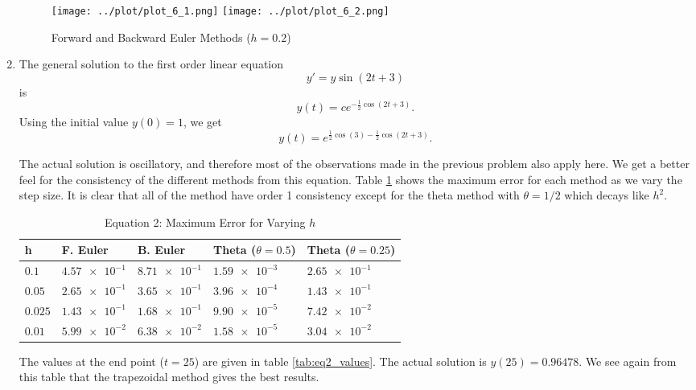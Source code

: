 \begin{solution}
\begin{enumerate}
    \begin{figure}[!ht]
      \centering
      \texttt{[image: ../plot/plot\_6\_1.png]}
      \texttt{[image: ../plot/plot\_6\_2.png]}
      \caption{Forward and Backward Euler Methods ($h = 0.2$)}
      \label{fig:stability}
    \end{figure}
    
    \item The general solution to the first order linear equation
    \[
      y' = y \sin(2t + 3)
    \]
    is 
    \[
      y(t) = c e^{-\frac12 \cos(2t + 3)}.
    \]
    Using the initial value $y(0) = 1$, we get 
    \[
      y(t) = e^{\frac12 \cos(3)-\frac12 \cos(2t + 3)}.
    \]
    
    The actual solution is oscillatory, and therefore most of the observations made in the previous problem also apply here. We get a better feel for the consistency of the different methods from this equation. Table \ref{tab:eq2_error} shows the maximum error for each method as we vary the step size. It is clear that all of the method have order 1 consistency except for the theta method with $\theta = 1/2$ which decays like $h^2$.
    
    \begin{table}[!ht]
      \label{tab:eq2_error}
      \centering
      \caption{Equation 2: Maximum Error for Varying $h$}
      \begin{tabular}{|l|l|l|l|l|}
        \hline
        h & F. Euler & B. Euler & Theta ($\theta = 0.5$) & Theta ($\theta =0.25$) \\
        \hline
        $0.1$   & $\num{4.57e-1}$ & $\num{8.71e-1}$ & $\num{1.59e-3}$ & $\num{2.65e-1}$ \\
        $0.05$  & $\num{2.65e-1}$ & $\num{3.65e-1}$ & $\num{3.96e-4}$ & $\num{1.43e-1}$ \\
        $0.025$ & $\num{1.43e-1}$ & $\num{1.68e-1}$ & $\num{9.90e-5}$ & $\num{7.42e-2}$ \\
        $0.01$  & $\num{5.99e-2}$ & $\num{6.38e-2}$ & $\num{1.58e-5}$ & $\num{3.04e-2}$ \\
        \hline
      \end{tabular}
    \end{table}
    
    The values at the end point ($t = 25$) are given in table \ref{tab:eq2_values}. The actual solution is $y(25) = 0.96478$. We see again from this table that the trapezoidal method gives the best results. 
    

\end{enumerate}
\end{solution}
